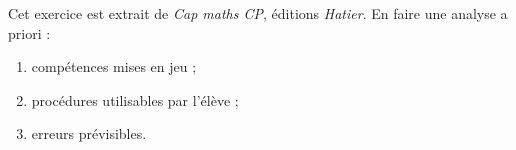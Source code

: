 \bigskip

\begin{exercice}
\begin{minipage}{6cm}
   Cet exercice est extrait de \textit{Cap maths CP}, éditions {\it Hatier}.
   En faire une analyse a priori : 
   \begin{enumerate}
      \item compétences mises en jeu ;
      \item procédures utilisables par l'élève ;
      \item erreurs prévisibles.
   \end{enumerate}
\end{minipage}
\qquad
{}
\end{exercice}

